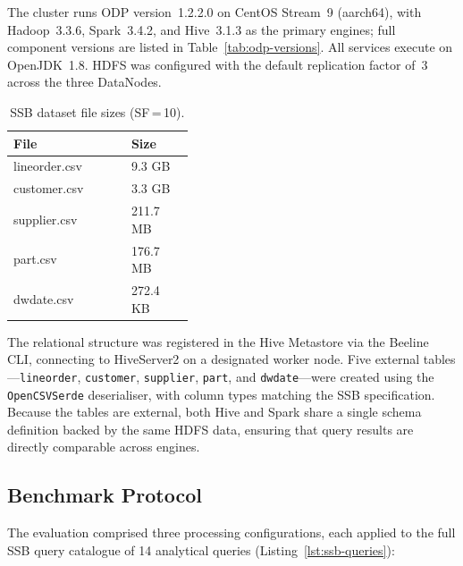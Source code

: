 The cluster runs ODP version~1.2.2.0 on CentOS Stream~9 (aarch64), with
Hadoop~3.3.6, Spark~3.4.2, and Hive~3.1.3 as the primary engines; full
component versions are listed in Table~\ref{tab:odp-versions}. All services
execute on OpenJDK~1.8. HDFS was configured with the default replication factor
of~3 across the three DataNodes.

\begin{table}[htbp]
  \centering
  \caption{SSB dataset file sizes (SF\,=\,10).}
  \label{tab:ssb-dataset-sizes}
  \renewcommand{\arraystretch}{1.2}
  \begin{tabular}{ p{0.25\linewidth} p{0.15\linewidth} }
    \hline
    \textbf{File} & \textbf{Size} \\
    \hline
    lineorder.csv & 9.3 GB \\
    \hline
    customer.csv  & 3.3 GB \\
    \hline
    supplier.csv  & 211.7 MB \\
    \hline
    part.csv      & 176.7 MB \\
    \hline
    dwdate.csv    & 272.4 KB \\
    \hline
  \end{tabular}
\end{table}

The relational structure was registered in the Hive Metastore via the Beeline
CLI, connecting to HiveServer2 on a designated worker node. Five external
tables---\texttt{lineorder}, \texttt{customer}, \texttt{supplier},
\texttt{part}, and \texttt{dwdate}---were created using the
\texttt{OpenCSVSerde} deserialiser, with column types matching the SSB
specification. Because the tables are external, both Hive and Spark share a
single schema definition backed by the same HDFS data, ensuring that query
results are directly comparable across engines.

\subsection{Benchmark Protocol}

The evaluation comprised three processing configurations, each applied to the
full SSB query catalogue of 14 analytical queries (Listing~\ref{lst:ssb-queries}):


